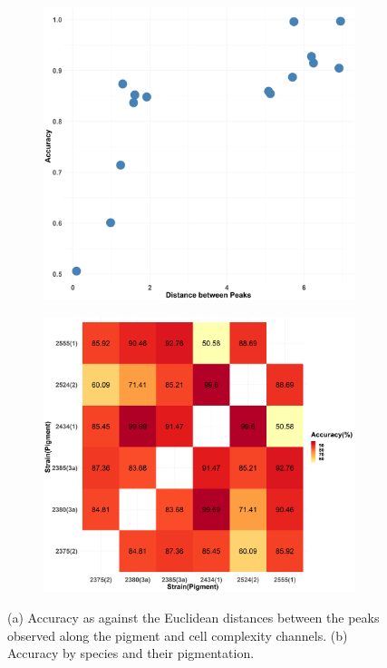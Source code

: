 \documentclass[a4paper,12pt]{extarticle}
\begin{document}
 \begin{figure}[t] 
 	\centering
 	\begin{subfigure}{0.48\linewidth} \centering
 		\includegraphics[scale = 0.2]{Figures/AccuracyPlot_Distance.png}
 		\caption{}
 	\end{subfigure}
 	\begin{subfigure}{0.48\linewidth} \centering
 		\includegraphics[scale = 0.2]{Figures/AccuracyPlot.png}
 		\caption{}
 	\end{subfigure}
 	\caption{(a) Accuracy as against the Euclidean distances between the peaks observed along the pigment and cell complexity channels. (b) Accuracy by species and their pigmentation.}
 	\label{fig:results}
 \end{figure}
 
\end{document}
